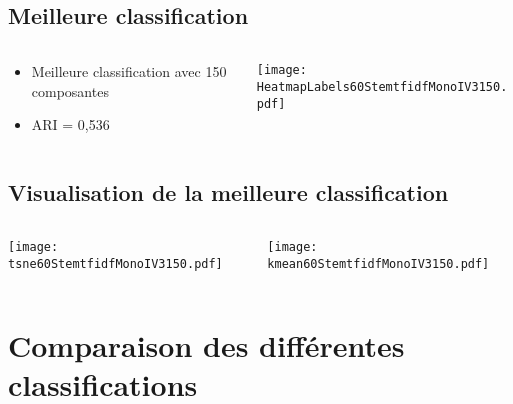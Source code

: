 \documentclass[8pt,aspectratio=169,hyperref={unicode=true}]{beamer}
\begin{document}
\subsection{Meilleure classification}
\begin{frame}{\insertsubsection}
    \begin{columns}
        \begin{column}{.4\textwidth}
            \begin{itemize}
                \item Meilleure classification avec 150 composantes
                \item ARI = 0,536
            \end{itemize}
        \end{column}
        \begin{column}{.6\textwidth}
            \texttt{[image: HeatmapLabels60StemtfidfMonoIV3150.pdf]}
        \end{column}
    \end{columns}
\end{frame}

\subsection{Visualisation de la meilleure classification}
\begin{frame}{\insertsubsection}
    \begin{columns}
        \begin{column}{.5\textwidth}
            \texttt{[image: tsne60StemtfidfMonoIV3150.pdf]}
        \end{column}
        \begin{column}{.5\textwidth}
            \texttt{[image: kmean60StemtfidfMonoIV3150.pdf]}
        \end{column}
    \end{columns}
\end{frame}

\section{Comparaison des différentes classifications}
\end{document}
